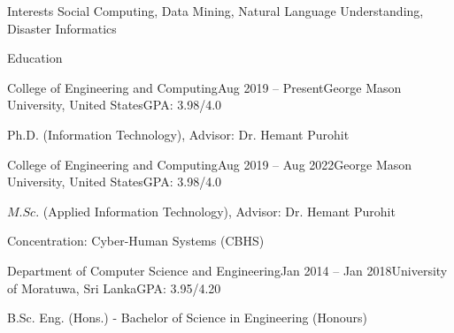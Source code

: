 \documentclass{resume} %
\title{}
\begin{document}
\vspace{-0.08in}

\begin{rSection}{Interests}
    Social Computing, Data Mining, Natural Language Understanding, Disaster Informatics
\end{rSection}

\vspace{-0.1in}

\begin{rSection}{Education}
    \begin{rSubsection}{College of Engineering and Computing}{Aug 2019 -- Present}{George Mason University, United States}{GPA: 3.98/4.0}
        \item Ph.D. (Information Technology), Advisor: Dr. Hemant Purohit
    \end{rSubsection}

    \vspace{-0.05in}

    \begin{rSubsection}{College of Engineering and Computing}{Aug 2019 -- Aug 2022}{George Mason University, United States}{GPA: 3.98/4.0}
        \item $M.Sc.$ (Applied Information Technology), Advisor: Dr. Hemant Purohit
        \item Concentration: Cyber-Human Systems (CBHS)
    \end{rSubsection}

    \vspace{-0.05in}


    \begin{rSubsection}{Department of Computer Science and Engineering}{Jan 2014 -- Jan 2018}{University of Moratuwa, Sri Lanka}{GPA: 3.95/4.20}
        \item B.Sc. Eng. (Hons.) - Bachelor of Science in Engineering (Honours)
    \end{rSubsection}
\end{rSection}
\end{document}
